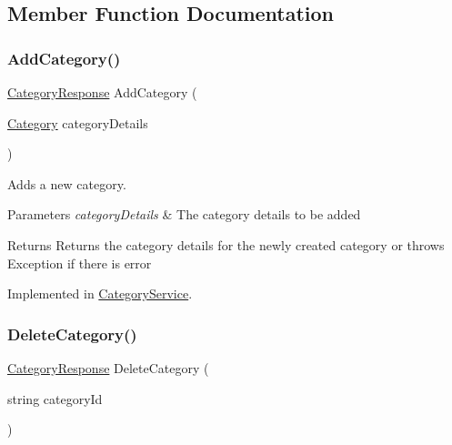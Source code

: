 \subsection{Member Function Documentation}
\mbox{\label{interfaceWildLifeTracker_1_1ICategoryService_ab22f6cdfb39adc2607dc86cb100889fc}} 
\subsubsection{\texorpdfstring{Add\+Category()}{AddCategory()}}
{\footnotesize\ttfamily \hyperlink{classWildLifeTracker_1_1Response_1_1CategoryResponse}{Category\+Response} Add\+Category (\begin{DoxyParamCaption}\item[{\hyperlink{classWildLifeTracker_1_1Models_1_1Category}{Category}}]{category\+Details }\end{DoxyParamCaption})}



Adds a new category. 
\begin{DoxyParams}{Parameters}
{\em category\+Details} & The category details to be added\\
\hline
\end{DoxyParams}
\begin{DoxyReturn}{Returns}
Returns the category details for the newly created category or throws Exception if there is error
\end{DoxyReturn}




Implemented in \hyperlink{classWildLifeTracker_1_1CategoryService_ab22f6cdfb39adc2607dc86cb100889fc}{Category\+Service}.

\mbox{\label{interfaceWildLifeTracker_1_1ICategoryService_a6479e2a6945b14d40e8c57642e9d2665}} 
\subsubsection{\texorpdfstring{Delete\+Category()}{DeleteCategory()}}
{\footnotesize\ttfamily \hyperlink{classWildLifeTracker_1_1Response_1_1CategoryResponse}{Category\+Response} Delete\+Category (\begin{DoxyParamCaption}\item[{string}]{category\+Id }\end{DoxyParamCaption})}



